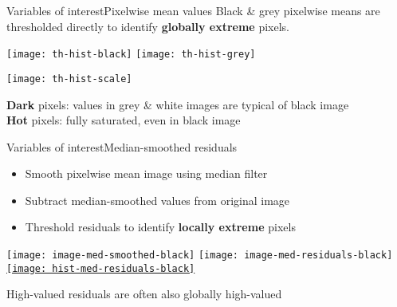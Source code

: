 \documentclass[8pt]{beamer}
\begin{document}

\begin{frame}{Variables of interest}{Pixelwise mean values}
	Black \& grey pixelwise means are thresholded directly to identify \textbf{globally extreme} pixels.
	\vspace{-12pt}
	\begin{center}
		\texttt{[image: th-hist-black]}
		\texttt{[image: th-hist-grey]}
		
		\texttt{[image: th-hist-scale]}
	\end{center}
	
	\textbf{Dark} pixels: values in grey \& white images are typical of black image\\
	\textbf{Hot} pixels: fully saturated, even in black image

\end{frame}
	

\begin{frame}[label = ms-res]{Variables of interest}{Median-smoothed residuals}
	\begin{itemize}
		\item Smooth pixelwise mean image using median filter
		\item Subtract median-smoothed values from original image
		\item Threshold residuals to identify \textbf{locally extreme} pixels		%
	\end{itemize}
	\begin{center}
		\texttt{[image: image-med-smoothed-black]}
		\texttt{[image: image-med-residuals-black]}
		\hyperlink{ms-res-supplemental}{\texttt{[image: hist-med-residuals-black]}}
	\end{center}
	High-valued residuals are often also globally high-valued
\end{frame}
 
 
\end{document}
